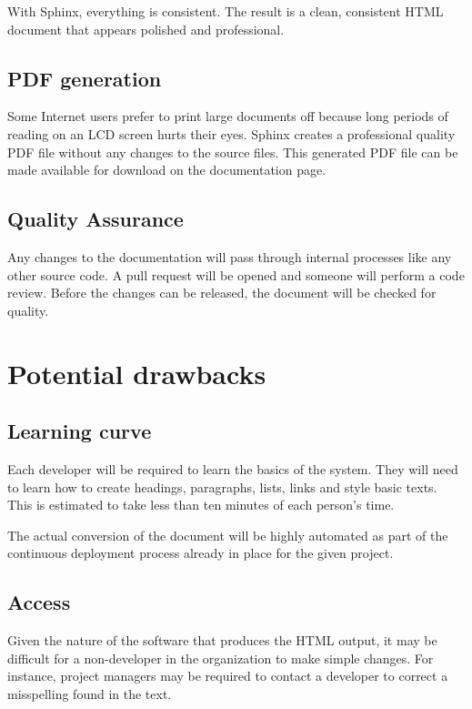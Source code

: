\documentclass[letterpaper]{report}
\begin{document}
        With Sphinx, everything is consistent. The result is a clean,
        consistent HTML document that appears polished and professional.

    \subsection*{PDF generation}

        Some Internet users prefer to print large documents off because long
        periods of reading on an LCD screen hurts their eyes. Sphinx creates a
        professional quality PDF file without any changes to the source files.
        This generated PDF file can be made available for download on the
        documentation page.

    \subsection*{Quality Assurance}

        Any changes to the documentation will pass through internal processes
        like any other source code. A pull request will be opened and someone
        will perform a code review. Before the changes can be released, the
        document will be checked for quality.

\section*{Potential drawbacks}

    \subsection*{Learning curve}

        Each developer will be required to learn the basics of the system. They
        will need to learn how to create headings, paragraphs, lists, links and
        style basic texts. This is estimated to take less than ten minutes of
        each person's time.

        The actual conversion of the document will be highly automated as part
        of the continuous deployment process already in place for the given
        project.

    \subsection*{Access}

        Given the nature of the software that produces the HTML output, it may
        be difficult for a non-developer in the organization to make simple
        changes. For instance, project managers may be required to contact a
        developer to correct a misspelling found in the text.
\end{document}
